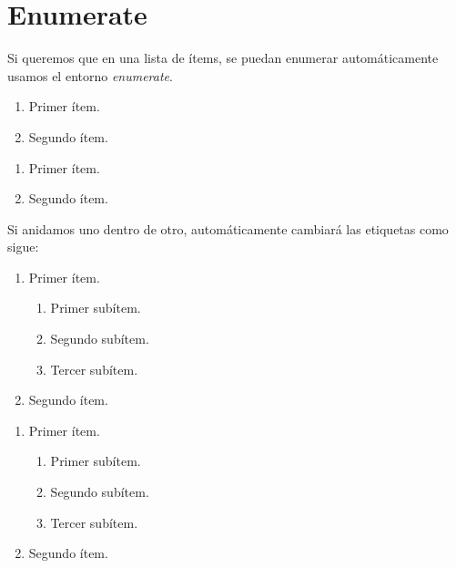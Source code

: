 \documentclass[graybox,envcountchap,sectrefs]{svmono}
\begin{document}
\section{Enumerate}
    Si queremos que en una lista de ítems, se puedan enumerar automáticamente usamos el entorno
    \emph{enumerate}.
    \begin{code}
        \begin{enumerate}
            \item Primer ítem.
            \item Segundo ítem.
        \end{enumerate}
    \end{code}
    \begin{compiled}
        \begin{enumerate}
            \item Primer ítem.
            \item Segundo ítem.
        \end{enumerate}
    \end{compiled}
    Si anidamos uno dentro de otro, automáticamente cambiará las etiquetas como sigue:
    \begin{code}
        \begin{enumerate}
            \item Primer ítem.
                \begin{enumerate}
                    \item Primer subítem.
                    \item Segundo subítem.
                    \item Tercer subítem.
                \end{enumerate}
            \item Segundo ítem.
        \end{enumerate}
    \end{code}
    \begin{compiled}
        \begin{enumerate}
            \item Primer ítem.
                \begin{enumerate}
                    \item Primer subítem.
                    \item Segundo subítem.
                    \item Tercer subítem.
                \end{enumerate}
            \item Segundo ítem.
        \end{enumerate}
    \end{compiled}
\end{document}
